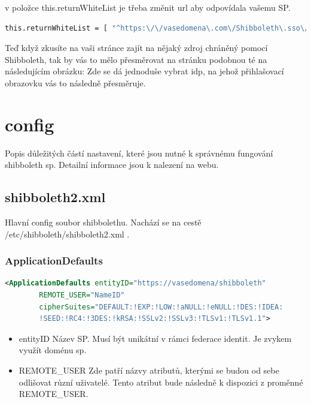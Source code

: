v položce this.returnWhiteList je třeba změnit url aby odpovídala vašemu SP. 

\begin{lstlisting}[language=Bash]
this.returnWhiteList = [ "^https:\/\/vasedomena\.com\/Shibboleth\.sso\/Login.*$" , "^https:\/\/vasedomena\.com\/Shibboleth\.sso\/Login.*$" ];
\end{lstlisting}

Teď když zkusíte na vaši stránce zajít na nějaký zdroj chráněný pomocí Shibboleth, tak by vás to mělo přesměrovat na stránku podobnou té na následujícím obrázku:
Zde se dá jednoduše vybrat idp, na jehož přihlašovací obrazovku vás to následně přesměruje.

\chapter{config}
Popis důležitých částí nastavení, které jsou nutné k správnému fungování shibboleth sp. Detailní informace jsou k nalezení na webu\cite{SPconfig}. 

\section{shibboleth2.xml}
Hlavní config soubor shibbolethu. Nachází se na cestě /etc/shibboleth/shibboleth2.xml .

\subsection{ApplicationDefaults}
\begin{lstlisting}[language=xml]
<ApplicationDefaults entityID="https://vasedomena/shibboleth"
        REMOTE_USER="NameID"
        cipherSuites="DEFAULT:!EXP:!LOW:!aNULL:!eNULL:!DES:!IDEA:
        !SEED:!RC4:!3DES:!kRSA:!SSLv2:!SSLv3:!TLSv1:!TLSv1.1">
\end{lstlisting}
\begin{itemize}
    \item entityID \linebreak
    Název SP. Musí být unikátní v rámci federace identit. Je zvykem využít doménu sp.  
    \item REMOTE\_USER \linebreak
    Zde patří názvy atributů, kterými se budou od sebe odlišovat různí uživatelé. 
    Tento atribut bude následně k dispozici z proměnné REMOTE\_USER.
\end{itemize}
